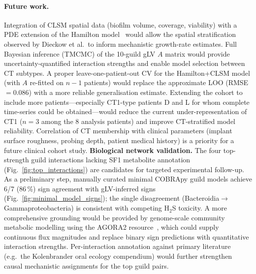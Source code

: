\documentclass[11pt,a4paper]{article}
\begin{document}
\paragraph{Future work.}
Integration of CLSM spatial data (biofilm volume, coverage, viability) with a PDE extension of the Hamilton model~\cite{Klempt2025ContinuumBiofilm} would allow the spatial stratification observed by Dieckow et al.\ to inform mechanistic growth-rate estimates.
Full Bayesian inference (TMCMC) of the 10-guild gLV $A$ matrix would provide uncertainty-quantified interaction strengths and enable model selection between CT subtypes.
A proper leave-one-patient-out CV for the Hamilton+CLSM model (with $A$ re-fitted on $n-1$ patients) would replace the approximate LOO (RMSE\,$=0.086$) with a more reliable generalisation estimate.
Extending the cohort to include more patients---especially CT1-type patients D and L for whom complete time-series could be obtained---would reduce the current under-representation of CT1 ($n=3$ among the 8 analysis patients) and improve CT-stratified model reliability.
Correlation of CT membership with clinical parameters (implant surface roughness, probing depth, patient medical history) is a priority for a future clinical cohort study.
\textbf{Biological network validation.}
The four top-strength guild interactions lacking SF1 metabolite annotation (Fig.~\ref{fig:top_interactions}) are candidates for targeted experimental follow-up.
As a preliminary step, manually curated minimal COBRApy guild models achieve 6/7 (86\,\%) sign agreement with gLV-inferred signs (Fig.~\ref{fig:minimal_model_signs}); the single disagreement (Bacteroidia$\to$Gammaproteobacteria) is consistent with competing H$_2$S toxicity.
A more comprehensive grounding would be provided by genome-scale community metabolic modelling using the AGORA2 resource~\cite{Thiele2020AGORA}, which could supply continuous flux magnitudes and replace binary sign predictions with quantitative interaction strengths.
Per-interaction annotation against primary literature (e.g.\ the Kolenbrander oral ecology compendium) would further strengthen causal mechanistic assignments for the top guild pairs.



\end{document}
